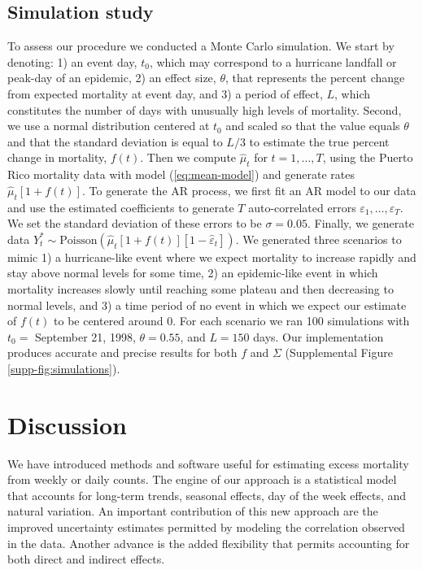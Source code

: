 \documentclass[11pt]{article}
\begin{document}
\subsection{Simulation study}
\label{subsec:simulations}
To assess our procedure we conducted a Monte Carlo simulation. We start by denoting: 1) an event day, $t_0$, which may correspond to a hurricane landfall or peak-day of an epidemic, 2) an effect size, $\theta$, that represents the percent change from expected mortality at event day, and 3) a period of effect, $L$, which constitutes the number of days with unusually high levels of mortality. Second, we use a normal distribution centered at $t_0$ and scaled so that the value equals $\theta$ and that the standard deviation is equal to $L/3$ to estimate the true percent change in mortality, $f(t)$. Then we compute $\hat{\mu}_t$ for $t=1,\ldots, T$, using the Puerto Rico mortality data with model (\ref{eq:mean-model}) and generate rates $\hat{\mu}_t\left[1+f(t)\right]$. To generate the AR process, we first fit an AR model to our data and use the estimated coefficients to generate $T$ auto-correlated errors $\varepsilon_1, \dots, \varepsilon_T$. We set the standard deviation of these errors to be $\sigma = 0.05$.  Finally, we generate data $Y_t^* \sim \mbox{Poisson}\left(\hat{\mu}_t[1+f(t)][1 - \hat{\varepsilon}_t]\right)$. We generated three scenarios to mimic 1) a hurricane-like event where we expect mortality to increase rapidly and stay above normal levels for some time, 2) an epidemic-like event in which mortality increases slowly until reaching some plateau and then decreasing to normal levels, and 3) a time period of no event in which we expect our estimate of $f(t)$ to be centered around 0. For each scenario we ran 100 simulations with $t_0 = $ September 21, 1998, $\theta = 0.55$, and $L=150$ days. Our implementation produces accurate and precise results for both $f$ and $\Sigma$ (Supplemental Figure \ref{supp-fig:simulations}).

\section{Discussion}
We have introduced methods and software useful for estimating excess mortality from weekly or daily counts. The engine of our approach is a statistical model that accounts for long-term trends, seasonal effects, day of the week effects, and natural variation. An important contribution of this new approach are the improved uncertainty estimates permitted by modeling the correlation observed in the data. Another advance is the added flexibility that permits accounting for both direct and indirect effects. 
\end{document}
